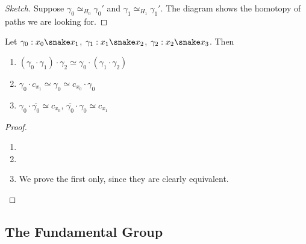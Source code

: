 \documentclass{article}
\numberwithin{nthm}{subsection}
\begin{document}
\begin{proof}[Sketch]
    Suppose $\gamma_0 \simeq_{H_0} \gamma_0'$ and $\gamma_1 \simeq_{H_1} \gamma_1'$.
    The diagram shows the homotopy of paths we are looking for.
\end{proof}

\begin{nprop}
    Let $\gamma_0:x_0 \snake x_1$, $\gamma_1: x_1 \snake x_2$, $\gamma_2: x_2 \snake x_3$.
    Then
    \begin{enumerate}[label=(\roman*)]
        \item $(\gamma_0 \cdot \gamma_1) \cdot \gamma_2 \simeq \gamma_0 \cdot (\gamma_1 \cdot \gamma_2)$
        \item $\gamma_0 \cdot c_{x_1} \simeq \gamma_0 \simeq c_{x_0} \cdot \gamma_0$
        \item $\gamma_0 \cdot \overline{\gamma_0} \simeq c_{x_0}$, $\overline{\gamma_0} \cdot \gamma_0 \simeq c_{x_1}$
    \end{enumerate}
\end{nprop}

\begin{proof}
    \leavevmode
    \begin{enumerate}[label=(\roman*)]
        \item

        \item
        \item We prove the first only, since they are clearly equivalent.
    \end{enumerate}
\end{proof}

\subsection{The Fundamental Group}
\end{document}
